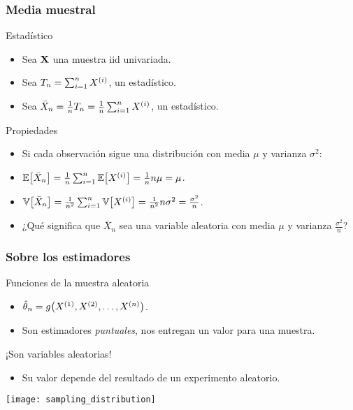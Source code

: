 \documentclass[table]{beamer}
\begin{document}
\begin{frame}
    \frametitle{Media muestral}
    \begin{block}{Estadístico}
        \begin{itemize}
            \item Sea $\mathbf{X}$ una muestra iid univariada.
            \item Sea $T_{n} = \sum_{i = 1}^{n} X^{\parens{i}}$, un estadístico.
            \item Sea $\bar{X}_{n} = \frac{1}{n} T_{n} = \frac{1}{n} \sum_{i = 1}^{n} X^{\parens{i}}$, un estadístico.
        \end{itemize}
    \end{block}
    \begin{block}{Propiedades}
        \begin{itemize}
            \item Si cada observación sigue una distribución con media $\mu$ y varianza $\sigma^{2}$:
            \item $\expected{\bar{X}_{n}} = \frac{1}{n} \sum_{i = 1}^{n} \expected{X^{\parens{i}}} = \frac{1}{n} n \mu = \mu$.
            \item $\variance{\bar{X}_{n}} = \frac{1}{n^{2}} \sum_{i = 1}^{n} \variance{X^{\parens{i}}} = \frac{1}{n^{2}} n \sigma^{2} = \frac{\sigma^{2}}{n}$.
        \end{itemize}
    \end{block}
    \begin{block}{}
        \begin{itemize}
            \item ¿Qué significa que $\bar{X}_{n}$ sea una variable aleatoria con media $\mu$ y varianza $\frac{\sigma^{2}}{n}$?
        \end{itemize}
    \end{block}
\end{frame}

\begin{frame}
    \frametitle{Sobre los estimadores}
    \begin{block}{Funciones de la muestra aleatoria}
        \begin{itemize}
            \item $\hat{\theta}_{n} = g \parens{X^{\parens{1}} , X^{\parens{2}} , \ldots , X^{\parens{n}}}$.
            \item Son estimadores \emph{puntuales}, nos entregan un valor para una muestra.
        \end{itemize}
    \end{block}
    \begin{block}{¡Son variables aleatorias!}
        \begin{itemize}
            \item Su valor depende del resultado de un experimento aleatorio.
        \end{itemize}
    \end{block}
    \begin{center}
        \texttt{[image: sampling\_distribution]}
    \end{center}
\end{frame}
\end{document}
